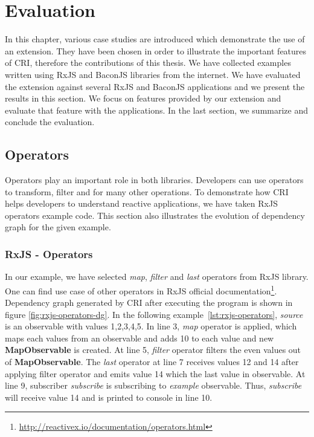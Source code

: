 \chapter{Evaluation} \label{chap:Evaluation}
In this chapter, various case studies are introduced which demonstrate the use of an extension. They have been chosen in order to illustrate the important features of CRI, therefore the contributions of this thesis. We have collected examples written using RxJS and BaconJS libraries from the internet. We have evaluated the extension against several RxJS and BaconJS applications and we present the results in this section. We focus on features provided by our extension and evaluate that feature with the applications. In the last section, we summarize and conclude the evaluation.

\section{Operators}
Operators play an important role in both libraries. Developers can use operators to transform, filter and for many other operations. To demonstrate how CRI helps developers to understand reactive applications, we have taken RxJS operators example code. This section also illustrates the evolution of dependency graph for the given example.

\subsection{RxJS - Operators}
In our example, we have selected \textit{map}, \textit{filter} and \textit{last} operators from RxJS library. One can find use case of other operators in RxJS official documentation\footnote{\url{http://reactivex.io/documentation/operators.html}}. Dependency graph generated by CRI after executing the program is shown in figure \ref{fig:rxjs-operators-dg}. In the following example~\ref{lst:rxjs-operators}, \textit{source} is an observable with values {1,2,3,4,5}. In line 3, \textit{map} operator is applied, which maps each values from an observable and adds 10 to each value and new \textbf{MapObservable} is created. At line 5, \textit{filter} operator filters the even values out of \textbf{MapObservable}. The \textit{last} operator at line 7 receives values 12 and 14 after applying filter operator and emits value 14 which the last value in observable. At line 9, subscriber \textit{subscribe} is subscribing to \textit{example} observable. Thus, \textit{subscribe} will receive value 14 and is printed to console in line 10.


